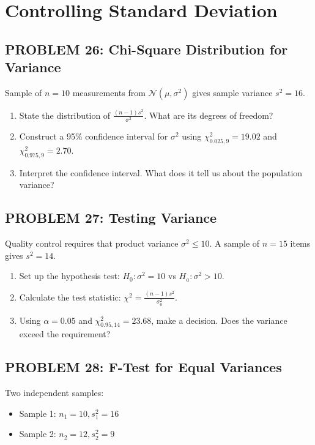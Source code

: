 \documentclass[12pt]{article}
\begin{document}
\newpage
\section*{Controlling Standard Deviation}

\subsection*{PROBLEM 26: Chi-Square Distribution for Variance}

Sample of \(n = 10\) measurements from \(\mathcal{N}(\mu, \sigma^2)\) gives sample variance \(s^2 = 16\).

\begin{enumerate}
\item[(a)] State the distribution of \(\frac{(n-1)s^2}{\sigma^2}\). What are its degrees of freedom?
\item[(b)] Construct a 95\% confidence interval for \(\sigma^2\) using \(\chi^2_{0.025,9} = 19.02\) and \(\chi^2_{0.975,9} = 2.70\).
\item[(c)] Interpret the confidence interval. What does it tell us about the population variance?
\end{enumerate}

\subsection*{PROBLEM 27: Testing Variance}

Quality control requires that product variance \(\sigma^2 \leq 10\). A sample of \(n = 15\) items gives \(s^2 = 14\).

\begin{enumerate}
\item[(a)] Set up the hypothesis test: \(H_0: \sigma^2 = 10\) vs \(H_a: \sigma^2 > 10\).
\item[(b)] Calculate the test statistic: \(\chi^2 = \frac{(n-1)s^2}{\sigma_0^2}\).
\item[(c)] Using \(\alpha = 0.05\) and \(\chi^2_{0.95,14} = 23.68\), make a decision. Does the variance exceed the requirement?
\end{enumerate}

\subsection*{PROBLEM 28: F-Test for Equal Variances}

Two independent samples:
\begin{itemize}
    \item Sample 1: \(n_1 = 10, s_1^2 = 16\)
    \item Sample 2: \(n_2 = 12, s_2^2 = 9\)
\end{itemize}
\end{document}
